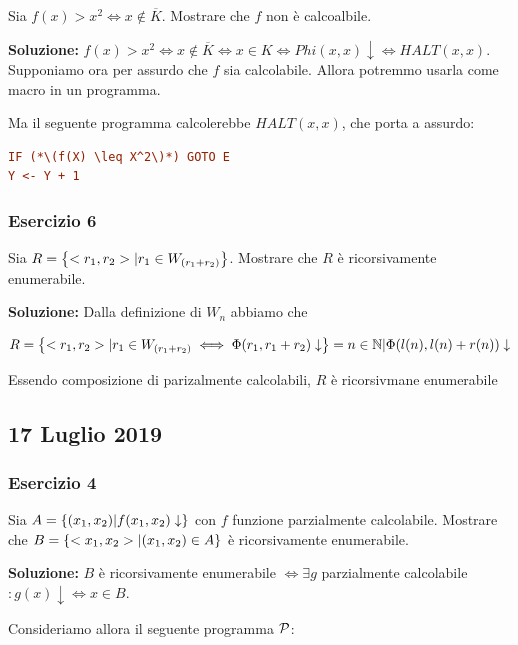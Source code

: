 Sia \(f(x)>x^2 \iff x \nin \overline{K}\). Mostrare che \(f\) non è calcoalbile.

\textbf{Soluzione:} \(f(x)>x^2 \iff x \nin \overline{K} \iff x \in K \iff Phi(x,x) \downarrow \iff \textit{HALT}(x,x)\). Supponiamo ora per assurdo che \(f\) sia calcolabile. Allora potremmo usarla come macro in un programma.

Ma il seguente programma calcolerebbe \(\textit{HALT}(x,x)\), che porta a assurdo:

\begin{lstlisting}[language=ini, caption={ }]
IF (*\(f(X) \leq X^2\)*) GOTO E
Y <- Y + 1
\end{lstlisting}

\subsubsection{Esercizio 6}

Sia \(R=\displaystyle{\left\{{<r_1,r_2> \vert r_1 \in W_{(r_1+r_2)}}\right\}}\). Mostrare che \(R\) è ricorsivamente enumerabile.

\textbf{Soluzione:} Dalla definizione di \(W_n\) abbiamo che

\begin{equation}
  R=\displaystyle{\left\{{<r_1,r_2> \vert r_1 \in W_{(r_1+r_2)} \iff \Phi(r_1,r_1+r_2) \downarrow}\right\}}={n \in \mathbb{N} \vert \Phi(l(n), l(n) + r(n)) \downarrow}
\end{equation}

Essendo composizione di parizalmente calcolabili, \(R\) è ricorsivmane enumerabile

\subsection{17 Luglio 2019}

\subsubsection{Esercizio 4}

Sia \(A = \displaystyle{\left\{{(x_1, x_2) \vert f(x_1, x_2) \downarrow}\right\}}\) con \(f\) funzione parzialmente calcolabile. Mostrare che \(B=\displaystyle{\left\{{<x_1, x_2> \vert (x_1, x_2) \in A}\right\}}\) è ricorsivamente enumerabile.

\textbf{Soluzione:} \(B\) è ricorsivamente enumerabile \(\iff \exists g\) parzialmente calcolabile \(: g(x) \downarrow \iff x \in B\).

Consideriamo allora il seguente programma \(\mathcal{P}\):

